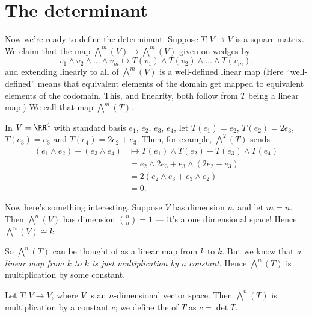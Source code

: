 \section{The determinant}

Now we're ready to define the determinant.
Suppose $T \colon V \to V$ is a square matrix.
We claim that the map $\bigwedge^m(V) \to \bigwedge^m(V)$ given on wedges by
\[ v_1 \wedge v_2 \wedge \dots \wedge v_m
	\mapsto T(v_1) \wedge T(v_2) \wedge \dots \wedge T(v_m). \]
and extending linearly to all of $\bigwedge^m(V)$ is a
well-defined  linear map
(Here ``well-defined'' means that equivalent elements of the domain
get mapped to equivalent elements of the codomain.
This, and linearity, both follow from $T$ being a linear map.)
We call that map $\bigwedge^m(T)$.
\begin{example}
	In $V = \RR^4$ with standard basis $e_1$, $e_2$, $e_3$, $e_4$,
	let $T(e_1) = e_2$, $T(e_2) = 2e_3$, $T(e_3) = e_3$ and $T(e_4) = 2e_2 + e_3$.
	Then, for example, $\bigwedge^2(T)$ sends
	\begin{align*}
		(e_1 \wedge e_2) + (e_3 \wedge e_4)
		&\mapsto T(e_1) \wedge T(e_2) + T(e_3) \wedge T(e_4) \\
		&= e_2 \wedge 2e_3 + e_3 \wedge (2e_2 + e_3) \\
		&= 2(e_2 \wedge e_3 + e_3 \wedge e_2) \\
		&= 0.
	\end{align*}
\end{example}

Now here's something interesting.
Suppose $V$ has dimension $n$, and let $m=n$.
Then $\bigwedge^n(V)$ has dimension $\binom nn = 1$ --- it's a one dimensional space!
Hence $\bigwedge^n(V) \cong k$.

So $\bigwedge^n(T)$ can be thought of as a linear map from $k$ to $k$.
But we know that \emph{a linear map from $k$ to $k$ is just multiplication by a constant}.
Hence $\bigwedge^n(T)$ is multiplication by some constant.
\begin{definition}
	Let $T \colon V \to V$, where $V$ is an $n$-dimensional vector space.
	Then $\bigwedge^n(T)$ is multiplication by a constant $c$;
	we define the  of $T$ as $c = \det T$.
\end{definition}


